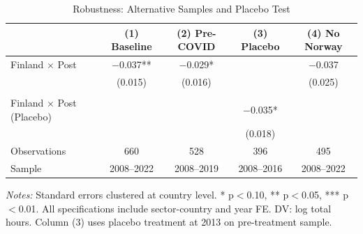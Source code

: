 \begin{table}[H]
\centering
\caption{Robustness: Alternative Samples and Placebo Test}
\label{tab:robust}
\small
\begin{threeparttable}
\begin{tabular}{lcccc}
\toprule
& (1) Baseline & (2) Pre-COVID & (3) Placebo & (4) No Norway \\
\midrule
Finland $\times$ Post & $-$0.037** & $-$0.029* & & $-$0.037 \\
& (0.015) & (0.016) & & (0.025) \\
\\
Finland $\times$ Post (Placebo) & & & $-$0.035* & \\
& & & (0.018) & \\
\midrule
Observations & 660 & 528 & 396 & 495 \\
Sample & 2008--2022 & 2008--2019 & 2008--2016 & 2008--2022 \\
\bottomrule
\end{tabular}
\begin{tablenotes}[flushleft]
\footnotesize
\item \textit{Notes:} Standard errors clustered at country level. * p$<$0.10, ** p$<$0.05, *** p$<$0.01. All specifications include sector-country and year FE. DV: log total hours. Column (3) uses placebo treatment at 2013 on pre-treatment sample.
\end{tablenotes}
\end{threeparttable}
\end{table}
